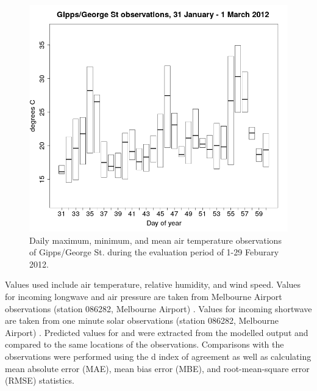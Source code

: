 \documentclass[final,3p,times,authoryear]{elsarticle}
\begin{document}
\begin{figure}[!htbp]
\center
\includegraphics[trim = 0mm 0mm 0mm 0mm, clip, scale=0.30]{images/CoMTempFeb2012.png}
\caption{Daily maximum, minimum, and mean air temperature observations of Gipps/George St. during the evaluation period of 1-29 Feburary 2012.\label{fig:CoMtemp}} 
\end{figure}


Values used include air temperature, relative humidity, and wind speed. Values for incoming longwave and air pressure are taken from Melbourne Airport observations (station 086282, Melbourne Airport) \citep{BOM2016b}. Values for incoming shortwave are taken from one minute solar observations (station 086282, Melbourne Airport) \citep{BOM2016}. Predicted values for  and  were extracted from the modelled output and compared to the same locations of the observations. Comparisons with the observations were performed using the \cite{Willmott1981} d index of agreement as well as calculating mean absolute error (MAE), mean bias error (MBE), and root-mean-square error (RMSE) statistics.
\end{document}

